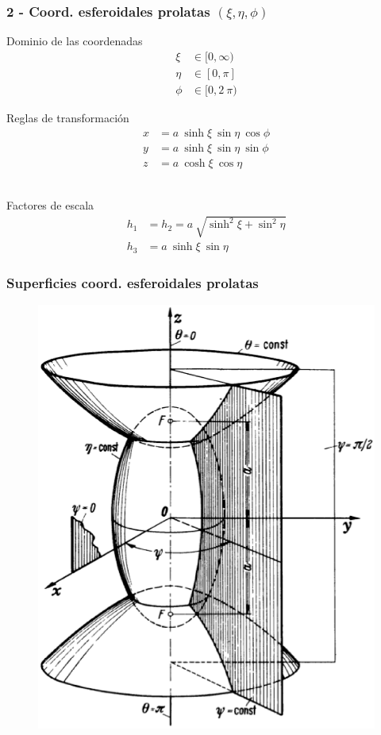 \documentclass[12pt]{beamer}
\begin{document}
\begin{frame}
\frametitle{2 - Coord. esferoidales prolatas $(\xi, \eta, \phi)$}
\fontsize{12}{12}\selectfont
\begin{minipage}{0.45\textwidth}
Dominio de las coordenadas
\begin{align*}
\xi &\in [0, \infty) \\
\eta &\in [0, \pi] \\
\phi &\in [0, 2 \: \pi)
\end{align*}
\end{minipage}
\hspace{1cm}
\begin{minipage}{0.4\textwidth}
Reglas de transformación
\begin{align*}
x &= a \: \sinh \xi \: \sin \eta \: \cos \phi\\
y &= a \: \sinh \xi \: \sin \eta \: \sin \phi\\
z &= a \: \cosh \xi \: \cos \eta
\end{align*}
\end{minipage}
\\
\bigskip
Factores de escala
\begin{align*}
h_{1} &= h_{2} = a \: \sqrt{\sinh^{2} \xi + \sin^{2} \eta} \\
h_{3 }&= a \: \sinh \xi \: \sin \eta
\end{align*}
\end{frame}
\begin{frame}
\frametitle{Superficies coord. esferoidales prolatas}
\begin{figure}[H]
  \centering
  \includegraphics[scale=0.3]{Imagenes/Sistema_Esfeoridal_Prolato.eps}
\end{figure}
\end{frame}
\end{document}
